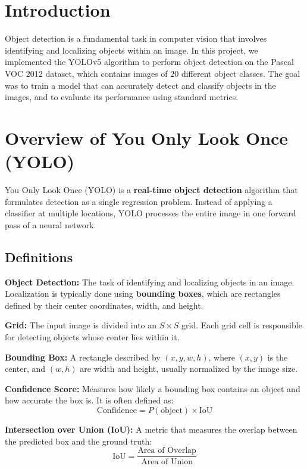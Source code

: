 \documentclass[12pt, a4paper]{article}
\begin{document}
\restoregeometry

\tableofcontents
\newpage
\section{Introduction}
Object detection is a fundamental task in computer vision that involves identifying and localizing objects within an image. In this project, we implemented the YOLOv5 algorithm to perform object detection on the Pascal VOC 2012 dataset, which contains images of 20 different object classes. The goal was to train a model that can accurately detect and classify objects in the images, and to evaluate its performance using standard metrics.


\section{Overview of You Only Look Once (YOLO)}

You Only Look Once (YOLO) is a \textbf{real-time object detection} algorithm that formulates detection as a single regression problem. Instead of applying a classifier at multiple locations, YOLO processes the entire image in one forward pass of a neural network.

\subsection{Definitions}

\textbf{Object Detection:} The task of identifying and localizing objects in an image. Localization is typically done using \textbf{bounding boxes}, which are rectangles defined by their center coordinates, width, and height.

\textbf{Grid:} The input image is divided into an $S \times S$ grid. Each grid cell is responsible for detecting objects whose center lies within it.

\textbf{Bounding Box:} A rectangle described by $(x, y, w, h)$, where $(x,y)$ is the center, and $(w,h)$ are width and height, usually normalized by the image size.

\textbf{Confidence Score:} Measures how likely a bounding box contains an object and how accurate the box is. It is often defined as:
\[
\text{Confidence} = P(\text{object}) \times \text{IoU}
\]

\textbf{Intersection over Union (IoU):} A metric that measures the overlap between the predicted box and the ground truth:
\[
\text{IoU} = \frac{\text{Area of Overlap}}{\text{Area of Union}}
\]
\end{document}
